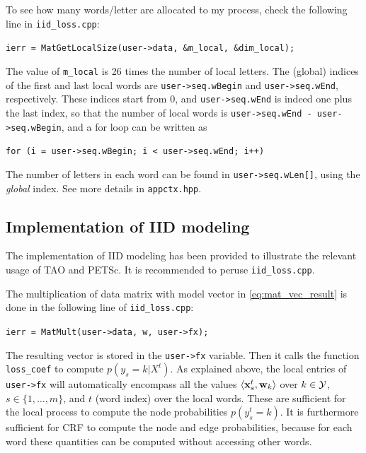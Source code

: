 \documentclass[11pt]{report}
\begin{document}
\cprotect{}

To see how many words/letter are allocated to my process, check the following line in \verb!iid_loss.cpp!:

\vspace{-0.5em}
\verb!ierr = MatGetLocalSize(user->data, &m_local, &dim_local);!
\vspace{-0.5em}

The value of \verb!m_local! is 26 times the number of local letters.
The (global) indices of the first and last local words are \verb!user->seq.wBegin! and \verb!user->seq.wEnd!, respectively.
These indices start from 0, and \verb!user->seq.wEnd! is indeed one plus the last index,
so that the number of local words is \verb!user->seq.wEnd - user->seq.wBegin!,
and a for loop can be written as

\vspace{-0.25em}
\verb!for (i = user->seq.wBegin; i < user->seq.wEnd; i++)!
\vspace{-0.25em}

The number of letters in each word can be found in \verb!user->seq.wLen[]!,
using the \emph{global} index.
See more details in \verb!appctx.hpp!.


\subsection{Implementation of IID modeling}

The implementation of IID modeling has been provided to illustrate the relevant usage of TAO and PETSc.
It is recommended to peruse \verb!iid_loss.cpp!.


The multiplication of data matrix with model vector in \eqref{eq:mat_vec_result} is done in the following line of \verb!iid_loss.cpp!:

\vspace{-0.25em}
\verb!ierr = MatMult(user->data, w, user->fx);!
\vspace{-0.25em}

The resulting vector is stored in the \verb!user->fx! variable.
Then it calls the function \verb!loss_coef! to compute $p(y_s = k | X^t)$.
As explained above, the local entries of \verb!user->fx! will automatically encompass all the values $\left\langle \mathbf{\boldsymbol{x}}^t_s,\mathbf{\boldsymbol{w}}_k \right\rangle$ over $k \in \mathcal{Y}$, $s \in \{1,\ldots,m\}$, and $t$ (word index) over the local words.
These are sufficient for the local process to compute the node probabilities $p(y^t_s = k)$.
It is furthermore sufficient for CRF to compute the node and edge probabilities,
because for each word these quantities can be computed without accessing other words.
\end{document}
